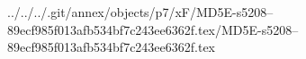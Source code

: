../../../.git/annex/objects/p7/xF/MD5E-s5208--89ecf985f013afb534bf7c243ee6362f.tex/MD5E-s5208--89ecf985f013afb534bf7c243ee6362f.tex